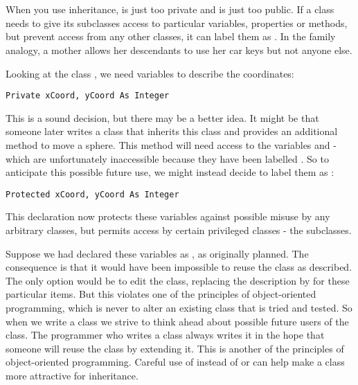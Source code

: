 	\section{}
		When you use inheritance,  is just too private and  is just too public. If a class needs to give its subclasses access to particular variables, properties or methods, but prevent access from any other classes, it can label them as . In the family analogy, a mother allows her descendants to use her car keys but not anyone else.
		
		Looking at the class , we need variables to describe the coordinates:
		\begin{lstlisting}
Private xCoord, yCoord As Integer
		\end{lstlisting}
		This is a sound decision, but there may be a better idea. It might be that someone later writes a class that inherits this class and provides an additional method to move a sphere. This method will need access to the variables  and  - which are unfortunately inaccessible because they have been labelled . So to anticipate this possible future use, we might instead decide to label them as :
		\begin{lstlisting}
Protected xCoord, yCoord As Integer
		\end{lstlisting}
		This declaration now protects these variables against possible misuse by any arbitrary classes, but permits access by certain privileged classes - the subclasses.
		
		Suppose we had declared these variables as , as originally planned. The consequence is that it would have been impossible to reuse the class as described. The only option would be to edit the class, replacing the description  by  for these particular items. But this violates one of the principles of object-oriented programming, which is never to alter an existing class that is tried and tested. So when we write a class we strive to think ahead about possible future users of the class. The programmer who writes a class always writes it in the hope that someone will reuse the class by extending it. This is another of the principles of object-oriented programming. Careful use of  instead of  or  can help make a class more attractive for inheritance.
		
